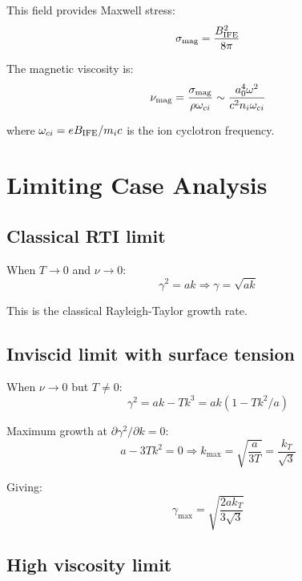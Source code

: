 \documentclass[aps,pre,twocolumn,showpacs,superscriptaddress]{revtex4-2}
\theoremstyle{definition}
\begin{document}
This field provides Maxwell stress:
\begin{equation}
\sigma_{\rm mag} = \frac{B_{\rm IFE}^2}{8\pi}
\end{equation}

The magnetic viscosity is:
\begin{equation}
\nu_{\rm mag} = \frac{\sigma_{\rm mag}}{\rho \omega_{ci}} \sim \frac{a_0^4 \omega^2}{c^2 n_i \omega_{ci}}
\end{equation}

where $\omega_{ci} = eB_{\rm IFE}/m_i c$ is the ion cyclotron frequency.

\section{Limiting Case Analysis}

\subsection{Classical RTI limit}

When $T \to 0$ and $\nu \to 0$:
\begin{equation}
\gamma^2 = ak \Rightarrow \gamma = \sqrt{ak}
\end{equation}

This is the classical Rayleigh-Taylor growth rate.

\subsection{Inviscid limit with surface tension}

When $\nu \to 0$ but $T \neq 0$:
\begin{equation}
\gamma^2 = ak - Tk^3 = ak(1 - Tk^2/a)
\end{equation}

Maximum growth at $\partial\gamma^2/\partial k = 0$:
\begin{equation}
a - 3Tk^2 = 0 \Rightarrow k_{\max} = \sqrt{\frac{a}{3T}} = \frac{k_T}{\sqrt{3}}
\end{equation}

Giving:
\begin{equation}
\gamma_{\max} = \sqrt{\frac{2ak_T}{3\sqrt{3}}}
\end{equation}

\subsection{High viscosity limit}
\end{document}
